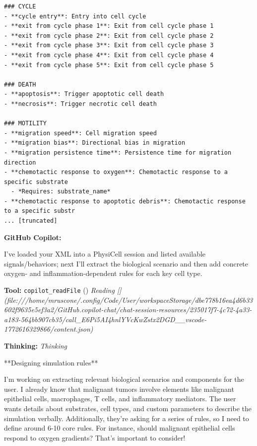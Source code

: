\documentclass[11pt,a4paper]{article}
\begin{document}
\begin{toolokbox}
\begin{lstlisting}
### CYCLE
- **cycle entry**: Entry into cell cycle
- **exit from cycle phase 1**: Exit from cell cycle phase 1
- **exit from cycle phase 2**: Exit from cell cycle phase 2
- **exit from cycle phase 3**: Exit from cell cycle phase 3
- **exit from cycle phase 4**: Exit from cell cycle phase 4
- **exit from cycle phase 5**: Exit from cell cycle phase 5

### DEATH
- **apoptosis**: Trigger apoptotic cell death
- **necrosis**: Trigger necrotic cell death

### MOTILITY
- **migration speed**: Cell migration speed
- **migration bias**: Directional bias in migration
- **migration persistence time**: Persistence time for migration direction
- **chemotactic response to oxygen**: Chemotactic response to a specific substrate
  - *Requires: substrate_name*
- **chemotactic response to apoptotic debris**: Chemotactic response to a specific substr
... [truncated]
\end{lstlisting}
\end{toolokbox}
\begin{copilotbox}
\textbf{GitHub Copilot:}

I’ve loaded your XML into a PhysiCell session and listed available signals/behaviors; next I’ll extract the biological scenario and then add concrete oxygen- and inflammation-dependent rules for each key cell type.

\end{copilotbox}
\begin{toolokbox}
\textbf{Tool:} \texttt{copilot\_readFile} (\checkmark)
\textit{Reading [](file:///home/mruscone/.config/Code/User/workspaceStorage/dbe778b16ea4d6b33602f9635e5ef3a2/GitHub.copilot-chat/chat-session-resources/235017f7-4c72-4a33-a183-564bb907cb35/call\_E6Pi5AI4hnlYVcKwZstx2DGD\_\_vscode-1772616329866/content.json)}
\end{toolokbox}
\begin{thinkbox}
\textbf{Thinking:} \textit{Thinking}

**Designing simulation rules**

I’m working on extracting relevant biological scenarios and components for the user. I already know that malignant tumors involve elements like malignant epithelial cells, macrophages, T cells, and inflammatory mediators. The user wants details about substrates, cell types, and custom parameters to describe the simulation verbally. Additionally, they’re asking for a series of rules, so I need to define around 6-10 core rules. For instance, should malignant epithelial cells respond to oxygen gradients? That’s important to consider!

\end{thinkbox}
\end{document}
